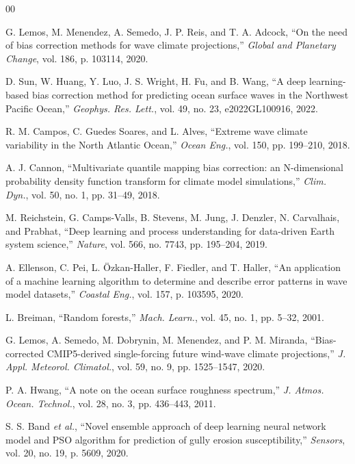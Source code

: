 \documentclass[conference]{IEEEtran}
\begin{document}
\begin{thebibliography}{00}

G. Lemos, M. Menendez, A. Semedo, J. P. Reis, and T. A. Adcock, ``On the need of bias correction methods for wave climate projections,'' \textit{Global and Planetary Change}, vol. 186, p. 103114, 2020.

D. Sun, W. Huang, Y. Luo, J. S. Wright, H. Fu, and B. Wang, ``A deep learning-based bias correction method for predicting ocean surface waves in the Northwest Pacific Ocean,'' \textit{Geophys. Res. Lett.}, vol. 49, no. 23, e2022GL100916, 2022.

R. M. Campos, C. Guedes Soares, and L. Alves, ``Extreme wave climate variability in the North Atlantic Ocean,'' \textit{Ocean Eng.}, vol. 150, pp. 199--210, 2018.

A. J. Cannon, ``Multivariate quantile mapping bias correction: an N-dimensional probability density function transform for climate model simulations,'' \textit{Clim. Dyn.}, vol. 50, no. 1, pp. 31--49, 2018.

M. Reichstein, G. Camps-Valls, B. Stevens, M. Jung, J. Denzler, N. Carvalhais, and Prabhat, ``Deep learning and process understanding for data-driven Earth system science,'' \textit{Nature}, vol. 566, no. 7743, pp. 195--204, 2019.

A. Ellenson, C. Pei, L. Özkan-Haller, F. Fiedler, and T. Haller, ``An application of a machine learning algorithm to determine and describe error patterns in wave model datasets,'' \textit{Coastal Eng.}, vol. 157, p. 103595, 2020.

L. Breiman, ``Random forests,'' \textit{Mach. Learn.}, vol. 45, no. 1, pp. 5--32, 2001.

G. Lemos, A. Semedo, M. Dobrynin, M. Menendez, and P. M. Miranda, ``Bias-corrected CMIP5-derived single-forcing future wind-wave climate projections,'' \textit{J. Appl. Meteorol. Climatol.}, vol. 59, no. 9, pp. 1525--1547, 2020.

P. A. Hwang, ``A note on the ocean surface roughness spectrum,'' \textit{J. Atmos. Ocean. Technol.}, vol. 28, no. 3, pp. 436--443, 2011.

S. S. Band \textit{et al.}, ``Novel ensemble approach of deep learning neural network model and PSO algorithm for prediction of gully erosion susceptibility,'' \textit{Sensors}, vol. 20, no. 19, p. 5609, 2020.

\end{thebibliography}
\end{document}
